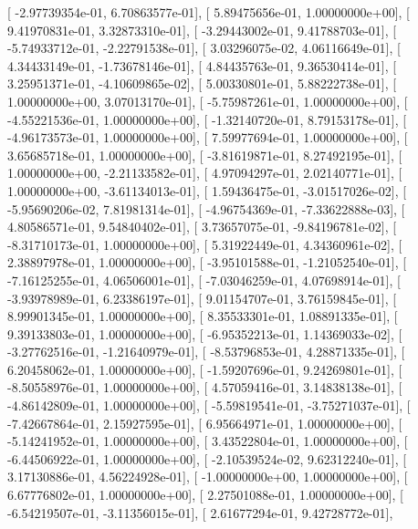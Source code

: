 \documentclass{article}
\begin{document}
       [ -2.97739354e-01,   6.70863577e-01],
       [  5.89475656e-01,   1.00000000e+00],
       [  9.41970831e-01,   3.32873310e-01],
       [ -3.29443002e-01,   9.41788703e-01],
       [ -5.74933712e-01,  -2.22791538e-01],
       [  3.03296075e-02,   4.06116649e-01],
       [  4.34433149e-01,  -1.73678146e-01],
       [  4.84435763e-01,   9.36530414e-01],
       [  3.25951371e-01,  -4.10609865e-02],
       [  5.00330801e-01,   5.88222738e-01],
       [  1.00000000e+00,   3.07013170e-01],
       [ -5.75987261e-01,   1.00000000e+00],
       [ -4.55221536e-01,   1.00000000e+00],
       [ -1.32140720e-01,   8.79153178e-01],
       [ -4.96173573e-01,   1.00000000e+00],
       [  7.59977694e-01,   1.00000000e+00],
       [  3.65685718e-01,   1.00000000e+00],
       [ -3.81619871e-01,   8.27492195e-01],
       [  1.00000000e+00,  -2.21133582e-01],
       [  4.97094297e-01,   2.02140771e-01],
       [  1.00000000e+00,  -3.61134013e-01],
       [  1.59436475e-01,  -3.01517026e-02],
       [ -5.95690206e-02,   7.81981314e-01],
       [ -4.96754369e-01,  -7.33622888e-03],
       [  4.80586571e-01,   9.54840402e-01],
       [  3.73657075e-01,  -9.84196781e-02],
       [ -8.31710173e-01,   1.00000000e+00],
       [  5.31922449e-01,   4.34360961e-02],
       [  2.38897978e-01,   1.00000000e+00],
       [ -3.95101588e-01,  -1.21052540e-01],
       [ -7.16125255e-01,   4.06506001e-01],
       [ -7.03046259e-01,   4.07698914e-01],
       [ -3.93978989e-01,   6.23386197e-01],
       [  9.01154707e-01,   3.76159845e-01],
       [  8.99901345e-01,   1.00000000e+00],
       [  8.35533301e-01,   1.08891335e-01],
       [  9.39133803e-01,   1.00000000e+00],
       [ -6.95352213e-01,   1.14369033e-02],
       [ -3.27762516e-01,  -1.21640979e-01],
       [ -8.53796853e-01,   4.28871335e-01],
       [  6.20458062e-01,   1.00000000e+00],
       [ -1.59207696e-01,   9.24269801e-01],
       [ -8.50558976e-01,   1.00000000e+00],
       [  4.57059416e-01,   3.14838138e-01],
       [ -4.86142809e-01,   1.00000000e+00],
       [ -5.59819541e-01,  -3.75271037e-01],
       [ -7.42667864e-01,   2.15927595e-01],
       [  6.95664971e-01,   1.00000000e+00],
       [ -5.14241952e-01,   1.00000000e+00],
       [  3.43522804e-01,   1.00000000e+00],
       [ -6.44506922e-01,   1.00000000e+00],
       [ -2.10539524e-02,   9.62312240e-01],
       [  3.17130886e-01,   4.56224928e-01],
       [ -1.00000000e+00,   1.00000000e+00],
       [  6.67776802e-01,   1.00000000e+00],
       [  2.27501088e-01,   1.00000000e+00],
       [ -6.54219507e-01,  -3.11356015e-01],
       [  2.61677294e-01,   9.42728772e-01],
\end{document}
